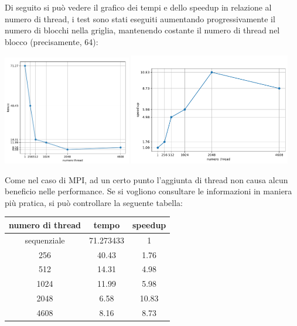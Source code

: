 \documentclass[12pt,openany]{report}
\begin{document}
Di seguito si può vedere il grafico dei tempi e dello speedup in relazione al numero di thread, i test sono stati eseguiti aumentando progressivamente il numero di blocchi nella griglia, mantenendo costante il numero di thread nel blocco (precisamente, 64):
\begin{center}
    \includegraphics[width=0.42\textwidth ]{images/tempiCUDA.pdf}
    \includegraphics[width=0.53\textwidth ]{images/speedupCUDA.pdf}
\end{center}\newpage
Come nel caso di MPI, ad un certo punto l'aggiunta di thread non causa alcun beneficio nelle performance. Se si vogliono consultare le informazioni in maniera più pratica, si può controllare la seguente tabella:
\begin{center}
    \begin{tabular}{|c|c|c|}
        \hline
        \rowcolor[HTML]{EFEFEF} 
        numero di thread & tempo     & speedup \\ \hline
        sequenziale      & 71.273433 & 1       \\ \hline
        256              & 40.43     & 1.76    \\ \hline
        512              & 14.31     & 4.98    \\ \hline
        1024             & 11.99     & 5.98    \\ \hline
        2048             & 6.58      & 10.83   \\ \hline
        4608             & 8.16      & 8.73    \\ \hline
        \end{tabular}
\end{center}
\newpage 
\end{document}
